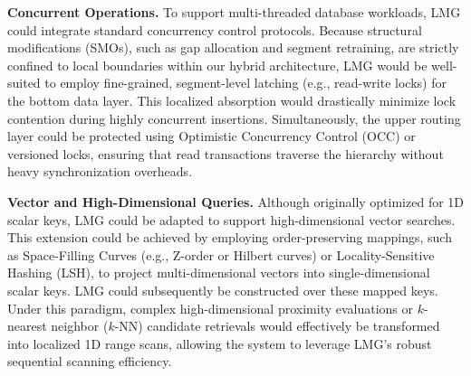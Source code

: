 \textbf{Concurrent Operations.} To support multi-threaded database workloads, LMG could integrate standard concurrency control protocols. Because structural modifications (SMOs), such as gap allocation and segment retraining, are strictly confined to local boundaries within our hybrid architecture, LMG would be well-suited to employ fine-grained, segment-level latching (e.g., read-write locks) for the bottom data layer. This localized absorption would drastically minimize lock contention during highly concurrent insertions. Simultaneously, the upper routing layer could be protected using Optimistic Concurrency Control (OCC) or versioned locks, ensuring that read transactions traverse the hierarchy without heavy synchronization overheads.

\textbf{Vector and High-Dimensional Queries.} Although originally optimized for 1D scalar keys, LMG could be adapted to support high-dimensional vector searches. This extension could be achieved by employing order-preserving mappings, such as Space-Filling Curves (e.g., Z-order or Hilbert curves) or Locality-Sensitive Hashing (LSH), to project multi-dimensional vectors into single-dimensional scalar keys. LMG could subsequently be constructed over these mapped keys. Under this paradigm, complex high-dimensional proximity evaluations or $k$-nearest neighbor ($k$-NN) candidate retrievals would effectively be transformed into localized 1D range scans, allowing the system to leverage LMG's robust sequential scanning efficiency.